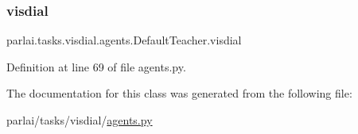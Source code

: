 \subsubsection{\texorpdfstring{visdial}{visdial}}
{\footnotesize\ttfamily parlai.\+tasks.\+visdial.\+agents.\+Default\+Teacher.\+visdial}



Definition at line 69 of file agents.\+py.



The documentation for this class was generated from the following file\+:\begin{DoxyCompactItemize}
\item 
parlai/tasks/visdial/\hyperlink{parlai_2tasks_2visdial_2agents_8py}{agents.\+py}\end{DoxyCompactItemize}
